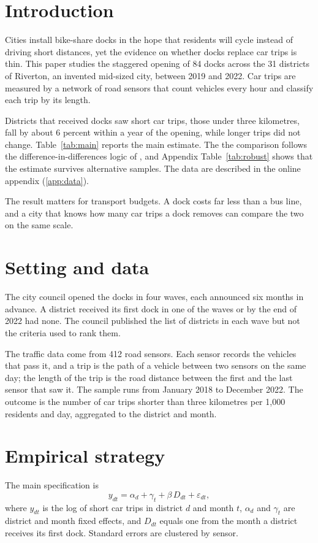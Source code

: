 \section{Introduction}\label{sec:intro}
Cities install bike-share docks in the hope that residents will cycle instead of driving short distances, yet the evidence on whether docks replace car trips is thin. This paper studies the staggered opening of 84 docks across the 31 districts of Riverton, an invented mid-sized city, between 2019 and 2022. Car trips are measured by a network of road sensors that count vehicles every hour and classify each trip by its length.

Districts that received docks saw short car trips, those under three kilometres, fall by about 6 percent within a year of the opening, while longer trips did not change. Table~\ref{tab:main} reports the main estimate. The the comparison follows the difference-in-differences logic of \citet{card1994minimum}, and Appendix Table~\ref{tab:robust} shows that the estimate survives alternative samples. The data are described in the online appendix (\ref{app:data}).

The result matters for transport budgets. A dock costs far less than a bus line, and a city that knows how many car trips a dock removes can compare the two on the same scale.

\section{Setting and data}\label{sec:data}
The city council opened the docks in four waves, each announced six months in advance. A district received its first dock in one of the waves or by the end of 2022 had none. The council published the list of districts in each wave but not the criteria used to rank them.

The traffic data come from 412 road sensors. Each sensor records the vehicles that pass it, and a trip is the path of a vehicle between two sensors on the same day; the length of the trip is the road distance between the first and the last sensor that saw it. The sample runs from January 2018 to December 2022. The outcome is the number of car trips shorter than three kilometres per 1,000 residents and day, aggregated to the district and month.

\section{Empirical strategy}\label{sec:strategy}
The main specification is
\begin{equation}
  y_{dt} = \alpha_d + \gamma_t + \beta\, D_{dt} + \varepsilon_{dt},
\end{equation}
where $y_{dt}$ is the log of short car trips in district $d$ and month $t$, $\alpha_d$ and $\gamma_t$ are district and month fixed effects, and $D_{dt}$ equals one from the month a district receives its first dock. Standard errors are clustered by sensor.

